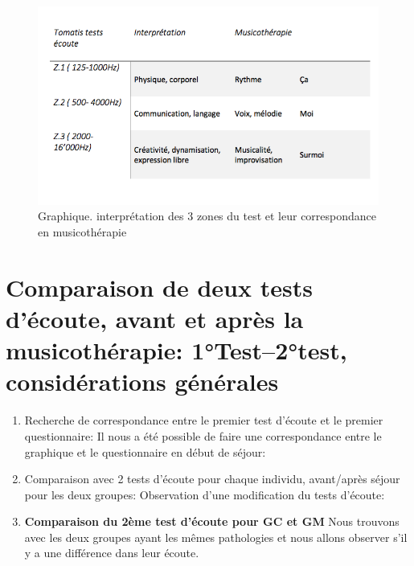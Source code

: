 \begin{figure}
	\centering
	\includegraphics[width=0.7\linewidth]{images/testinterpmusico}
	\caption[ L'interprétation des 3 zones et leur correspondance
        en musicothérapie]{Graphique. interprétation des 3 zones du
          test et leur correspondance en musicothérapie}
       
	\label{graphiquecolonnetestmusico}
      \end{figure}












      


  

\section{Comparaison de deux tests d'écoute, avant et après la musicothérapie: 1°Test--2°test, considérations générales}
	
        \begin{enumerate}
             
        \item Recherche de correspondance entre le premier test d'écoute et
     le premier questionnaire: Il nous a été possible de faire une
     correspondance entre le graphique et le questionnaire en début de
     séjour:


     
     
        \item Comparaison avec 2 tests d'écoute pour chaque individu,
          avant/après séjour pour les deux groupes:
          Observation d'une modification du tests d'écoute:


          
        
        \item\textbf{ Comparaison du 2ème test d'écoute pour GC et GM}
          Nous trouvons avec les deux groupes ayant les mêmes
          pathologies et nous allons observer s'il y a une différence
          dans leur écoute.
\end{enumerate}
	
